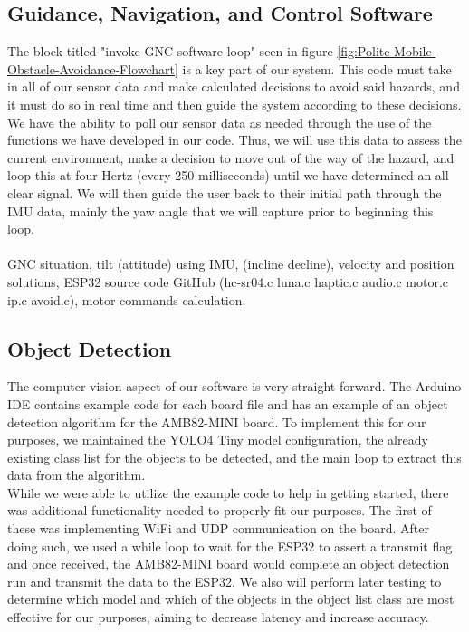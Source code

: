 \subsection{Guidance, Navigation, and Control Software}
\label{GNC_Software}
\noindent The block titled "invoke GNC software loop" seen in figure \ref{fig:Polite-Mobile-Obstacle-Avoidance-Flowchart} is a key part of our system. This code must take in all of our sensor data and make calculated decisions to avoid said hazards, and it must do so in real time and then guide the system according to these decisions. We have the ability to poll our sensor data as needed through the use of the functions we have developed in our code. Thus, we will use this data to assess the current environment, make a decision to move out of the way of the hazard, and loop this at four Hertz (every 250 milliseconds) until we have determined an all clear signal. We will then guide the user back to their initial path through the IMU data, mainly the yaw angle that we will capture prior to beginning this loop. \\


 \\
\noindent GNC situation, tilt (attitude) using IMU, (incline decline), velocity and position solutions, ESP32 source code GitHub (hc-sr04.c luna.c haptic.c audio.c motor.c ip.c avoid.c), motor commands calculation. \\


\subsection{Object Detection}
\noindent The computer vision aspect of our software is very straight forward. The Arduino IDE contains example code for each board file and has an example of an object detection algorithm for the AMB82-MINI board. To implement this for our purposes, we maintained the YOLO4 Tiny model configuration, the already existing class list for the objects to be detected, and the main loop to extract this data from the algorithm. \\

\noindent While we were able to utilize the example code to help in getting started, there was additional functionality needed to properly fit our purposes. The first of these was implementing WiFi and UDP communication on the board. After doing such, we used a while loop to wait for the ESP32 to assert a transmit flag and once received, the AMB82-MINI board would complete an object detection run and transmit the data to the ESP32. We also will perform later testing to determine which model and which of the objects in the object list class are most effective for our purposes, aiming to decrease latency and increase accuracy. \\

